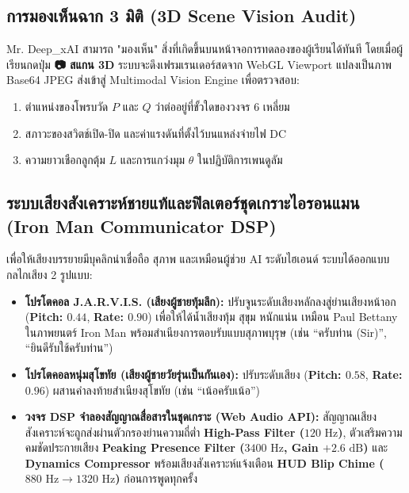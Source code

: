 \subsection{การมองเห็นฉาก 3 มิติ (3D Scene Vision Audit)}
Mr. Deep\_xAI สามารถ "มองเห็น" สิ่งที่เกิดขึ้นบนหน้าจอการทดลองของผู้เรียนได้ทันที โดยเมื่อผู้เรียนกดปุ่ม \textbf{📷 สแกน 3D} ระบบจะดึงเฟรมเรนเดอร์สดจาก WebGL Viewport แปลงเป็นภาพ Base64 JPEG ส่งเข้าสู่ Multimodal Vision Engine เพื่อตรวจสอบ:
\begin{enumerate}[leftmargin=1.5em, itemsep=2pt]
    \item ตำแหน่งของโพรบวัด $P$ และ $Q$ ว่าต่ออยู่ที่ขั้วใดของวงจร 6 เหลี่ยม
    \item สภาวะของสวิตช์เปิด-ปิด และค่าแรงดันที่ตั้งไว้บนแหล่งจ่ายไฟ DC
    \item ความยาวเชือกลูกตุ้ม $L$ และการแกว่งมุม $\theta$ ในปฏิบัติการเพนดูลัม
\end{enumerate}

\subsection{ระบบเสียงสังเคราะห์ชายแท้และฟิลเตอร์ชุดเกราะไอรอนแมน (Iron Man Communicator DSP)}
เพื่อให้เสียงบรรยายมีบุคลิกน่าเชื่อถือ สุภาพ และเหมือนผู้ช่วย AI ระดับไฮเอนด์ ระบบได้ออกแบบกลไกเสียง 2 รูปแบบ:
\begin{itemize}[leftmargin=1.5em, itemsep=3pt]
    \item \textbf{โปรโตคอล J.A.R.V.I.S. (เสียงผู้ชายทุ้มลึก):} ปรับจูนระดับเสียงหลักลงสู่ย่านเสียงหน้าอก (\textbf{Pitch: $0.44$}, \textbf{Rate: $0.90$}) เพื่อให้ได้น้ำเสียงทุ้ม สุขุม หนักแน่น เหมือน Paul Bettany ในภาพยนตร์ Iron Man พร้อมสำเนียงการตอบรับแบบสุภาพบุรุษ (เช่น ``ครับท่าน (Sir)'', ``ยินดีรับใช้ครับท่าน'')
    \item \textbf{โปรโตคอลหนุ่มสุโขทัย (เสียงผู้ชายวัยรุ่นเป็นกันเอง):} ปรับระดับเสียง (\textbf{Pitch: $0.58$}, \textbf{Rate: $0.96$}) ผสานคำลงท้ายสำเนียงสุโขทัย (เช่น ``เน้อครับเน้อ'')
    \item \textbf{วงจร DSP จำลองสัญญาณสื่อสารในชุดเกราะ (Web Audio API):} สัญญาณเสียงสังเคราะห์จะถูกส่งผ่านตัวกรองย่านความถี่ต่ำ \textbf{High-Pass Filter ($120\text{ Hz}$)}, ตัวเสริมความคมชัดประกายเสียง \textbf{Peaking Presence Filter ($3400\text{ Hz}$, Gain $+2.6\text{ dB}$)} และ \textbf{Dynamics Compressor} พร้อมเสียงสังเคราะห์แจ้งเตือน \textbf{HUD Blip Chime ($880\text{ Hz} \rightarrow 1320\text{ Hz}$)} ก่อนการพูดทุกครั้ง
\end{itemize}

